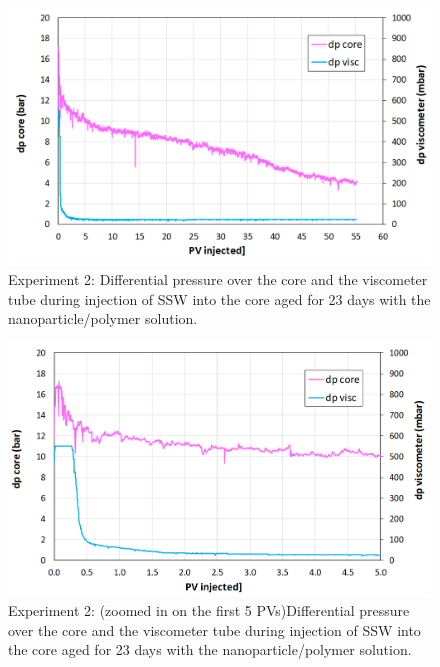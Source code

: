 \begin{figure}[h!]
    \centering
    \includegraphics[width=\textwidth]{img/cht/gelexp2_2.png}
    \caption{Experiment 2: Differential pressure over the core and the viscometer tube during injection of SSW into the core aged for 23 days with the nanoparticle/polymer solution.}
    \label{cht:gelexp2_2} %
\end{figure}

\begin{figure}[h!]
    \centering
    \includegraphics[width=\textwidth]{img/cht/gelexp2_3.png}
    \caption{Experiment 2: (zoomed in on the first 5 PVs)Differential pressure over the core and the viscometer tube during injection of SSW into the core aged for 23 days with the nanoparticle/polymer solution.}
    \label{cht:gelexp2_3} %
\end{figure}

